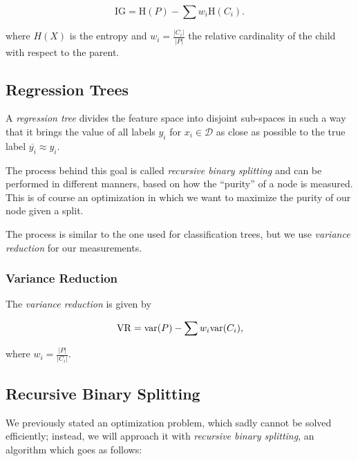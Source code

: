 \[
    \mathrm{IG} = \mathrm{H}(P) - \sum w_i \mathrm{H}(C_i).
\]

where \(H(X)\) is the entropy and \(w_i = \frac{|C_i|}{|P|} \) the relative cardinality of the child with respect to the parent.

\subsection{Regression Trees}

A \emph{regression tree} divides the feature space into disjoint sub-spaces in such a way that it brings
the value of all labels \(y_i\) for \(x_i \in \mathcal{D}\) as close as possible to the true label \(\overline{y_i} \approx y_i\).

The process behind this goal is called \emph{recursive binary splitting} and can be performed in different manners, based on
how the ``purity'' of a node is measured. This is of course an optimization in which we want to maximize the purity of our node given a split.

The process is similar to the one used for classification trees, but we use \emph{variance reduction} for our measurements.

\subsubsection{Variance Reduction}

The \emph{variance reduction} is given by 

\[
    \mathrm{VR} = \mathrm{var}(P) - \sum w_i \mathrm{var}(C_i),
\]

where \(w_i = \frac{|P|}{|C_i|}\).

\subsection{Recursive Binary Splitting}

We previously stated an optimization problem, which sadly cannot be solved efficiently; instead,
we will approach it with \emph{recursive binary splitting}, an algorithm which goes as follows:


